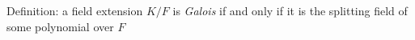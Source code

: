 \documentclass[preview]{standalone}
\begin{document}
\begin{center}
Definition: a field extension $K/F$ is \textit{Galois} if and only if it is the splitting field of some polynomial over $F$
\end{center}
\end{document}
